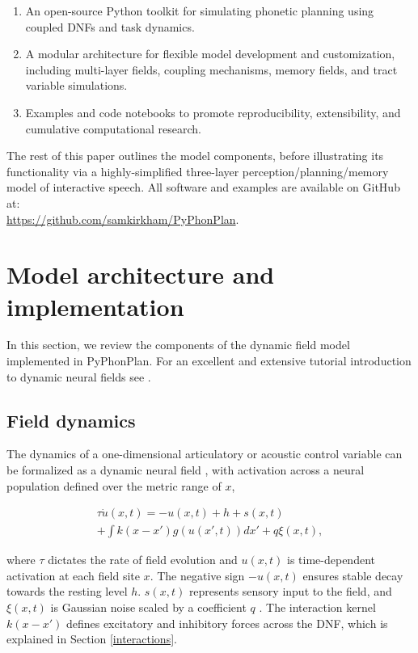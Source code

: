 \documentclass[cameraready]{Interspeech}
\begin{document}
\begin{enumerate}
    \item An open-source Python toolkit for simulating phonetic planning using coupled DNFs and task dynamics.
    \item A modular architecture for flexible model development and customization, including multi-layer fields, coupling mechanisms, memory fields, and tract variable simulations.
    \item Examples and code notebooks to promote reproducibility, extensibility, and cumulative computational research.
\end{enumerate}

The rest of this paper outlines the model components, before illustrating its functionality via a highly-simplified three-layer perception/planning/memory model of interactive speech. All software and examples are available on GitHub at:\\\url{https://github.com/samkirkham/PyPhonPlan}. 



\section{Model architecture and implementation}

In this section, we review the components of the dynamic field model implemented in PyPhonPlan. For an excellent and extensive tutorial introduction to dynamic neural fields see \cite{schoener-etal2016}.

\subsection{Field dynamics}

The dynamics of a one-dimensional articulatory or acoustic control variable can be formalized as a dynamic neural field \cite{erlhagen-schoener2002}, with activation across a neural population defined over the metric range of $x$,

\begin{multline}
\tau \dot{u}(x,t) = -u(x,t) + h + s(x,t)
\\
+ \int k(x-x') g(u(x',t))dx' + q\xi(x,t),
\label{dnf}
\end{multline}


where $\tau$ dictates the rate of field evolution and $u(x,t)$ is time-dependent activation at each field site $x$. The negative sign $-u(x,t)$ ensures stable decay towards the resting level $h$. $s(x,t)$ represents sensory input to the field, and $\xi(x,t)$ is Gaussian noise scaled by a coefficient $q$ \cite{schoener-etal2016}. The interaction kernel $k(x - x')$ defines excitatory and inhibitory forces across the DNF, which is explained in Section \ref{interactions}.
\end{document}
